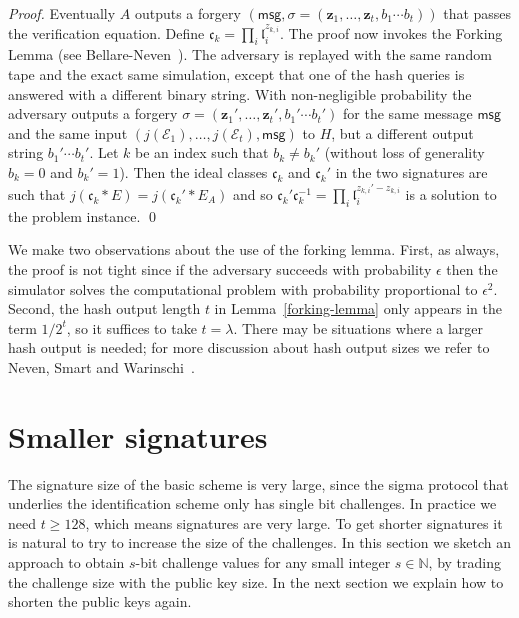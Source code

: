 \documentclass{llncs}
\newcommand{\E}{\mathcal{E}}
\newcommand{\N}{\mathbb{N}}
\newcommand{\msg}{\mathsf{msg}}
\renewcommand{\c}{\mathfrak{c}}
\renewcommand{\l}{\mathfrak{l}}
\newcommand{\z}{\mathbf{z}}
\begin{document}
\begin{proof}
\vskip 0.1cm

Eventually $A$ outputs a forgery $(\msg, \sigma = (\z_1, \dots, \z_t, b_1\cdots b_t))$ that passes the verification equation.
Define $\c_k = \prod_i \l_i^{z_{k,i}}$.
The proof now invokes the Forking Lemma (see Bellare-Neven~\cite{BN06}). The adversary is replayed with the same random tape and the exact same simulation, except that one of the hash queries is answered with a different binary string.
With non-negligible probability the adversary outputs a forgery $\sigma = (\z_1', \dots, \z_t', b_1'\cdots b_t')$ for the same message $\msg$ and the same input $(j(\E_1), \dots, j(\E_t), \msg)$ to $H$, but a different output string $b_1'\cdots b_t'$. Let $k$ be an index such that $b_k \ne b_k'$ (without loss of generality $b_k = 0$ and $b_k' = 1$). Then the ideal classes $\c_k$ and $\c_k'$ in the two signatures are such that $j( \c_k * E ) = j( \c_k' * E_A )$ and so $\c_k' \c_k^{-1} = \prod_i \l_i^{z_{k,i}' - z_{k,i}}$ is a solution to the problem instance. \qed
\end{proof}


We make two observations about the use of the forking lemma.
First, as always, the proof is not tight since if the adversary succeeds with probability $\epsilon$ then the simulator solves the computational problem with probability proportional to $\epsilon^2$.
Second, the hash output length $t$ in Lemma~\ref{forking-lemma} only appears in the term $1/2^t$, so it suffices to take $t = \lambda$.
There may be situations where a larger hash output is needed; for more discussion about hash output sizes we refer to Neven, Smart and Warinschi~\cite{NSW09}.




\section{Smaller signatures}\label{sec:smaller-sigs}


The signature size of the basic scheme is very large, since the sigma protocol that underlies the identification scheme only has single bit challenges. 
In practice we need $t \ge 128$, which means signatures are very large.
To get shorter signatures it is natural to try to increase the size of the challenges.
In this section we sketch an approach to obtain $s$-bit challenge values for any small integer $s \in \N$, by trading the challenge size with the public key size. In the next section we explain how to shorten the public keys again.
\end{document}
